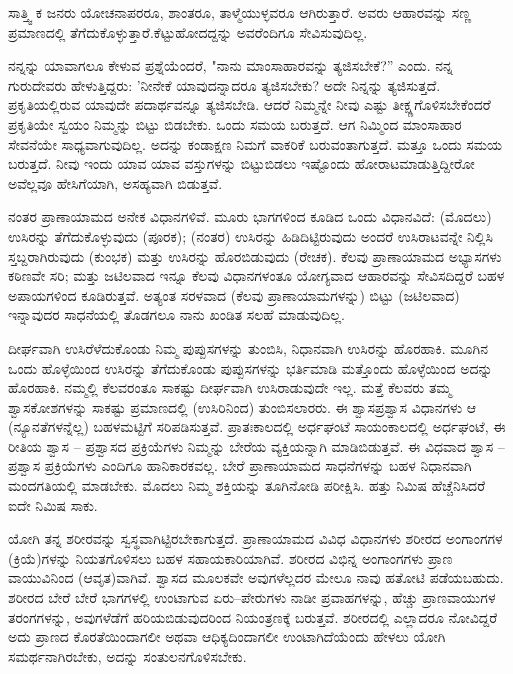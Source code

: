 ಸಾತ್ತ್ವಿ ಕ ಜನರು ಯೋಚನಾಪರರೂ, ಶಾಂತರೂ, ತಾಳ್ಮೆಯುಳ್ಳವರೂ ಆಗಿರುತ್ತಾರೆ. ಅವರು ಆಹಾರವನ್ನು ಸಣ್ಣ ಪ್ರಮಾಣದಲ್ಲಿ ತೆಗೆದುಕೊಳ್ಳುತ್ತಾರೆ.\break ಕೆಟ್ಟುಹೋದದ್ದನ್ನು ಅವರೆಂದಿಗೂ ಸೇವಿಸುವುದಿಲ್ಲ.

ನನ್ನನ್ನು ಯಾವಾಗಲೂ ಕೇಳುವ ಪ್ರಶ್ನೆಯೆಂದರೆ, "ನಾನು ಮಾಂಸಾಹಾರವನ್ನು ತ್ಯಜಿಸಬೇಕೆ?'' ಎಂದು. ನನ್ನ ಗುರುದೇವರು ಹೇಳುತ್ತಿದ್ದರು: 'ನೀನೇಕೆ ಯಾವುದನ್ನಾದರೂ ತ್ಯಜಿಸಬೇಕು? ಅದೇ ನಿನ್ನನ್ನು ತ್ಯಜಿಸುತ್ತದೆ. ಪ್ರಕೃತಿಯಲ್ಲಿರುವ ಯಾವುದೇ ಪದಾರ್ಥವನ್ನೂ ತ್ಯಜಿಸಬೇಡಿ. ಆದರೆ ನಿಮ್ಮನ್ನೇ ನೀವು ಎಷ್ಟು ತೀಕ್ಷ್ಣಗೊಳಿಸಬೇಕೆಂದರೆ ಪ್ರಕೃತಿಯೇ ಸ್ವಯಂ ನಿಮ್ಮನ್ನು ಬಿಟ್ಟು ಬಿಡಬೇಕು. ಒಂದು ಸಮಯ ಬರುತ್ತದೆ. ಆಗ ನಿಮ್ಮಿಂದ ಮಾಂಸಾಹಾರ ಸೇವನೆಯೇ ಸಾಧ್ಯವಾಗುವುದಿಲ್ಲ. ಅದನ್ನು ಕಂಡಾಕ್ಷಣ ನಿಮಗೆ ವಾಕರಿಕೆ ಬರುವಂತಾಗುತ್ತದೆ. ಮತ್ತೂ ಒಂದು ಸಮಯ ಬರುತ್ತದೆ. ನೀವು ಇಂದು ಯಾವ ಯಾವ ವಸ್ತುಗಳನ್ನು ಬಿಟ್ಟುಬಿಡಲು ಇಷ್ಟೊಂದು ಹೋರಾಟ\break ಮಾಡುತ್ತಿದ್ದೀರೋ ಅವೆಲ್ಲವೂ ಹೇಸಿಗೆಯಾಗಿ, ಅಸಹ್ಯವಾಗಿ ಬಿಡುತ್ತವೆ.

ನಂತರ ಪ್ರಾಣಾಯಾಮದ ಅನೇಕ ವಿಧಾನಗಳಿವೆ. ಮೂರು ಭಾಗಗಳಿಂದ ಕೂಡಿದ ಒಂದು ವಿಧಾನವಿದೆ: (ಮೊದಲು) ಉಸಿರನ್ನು ತೆಗೆದುಕೊಳ್ಳುವುದು (ಪೂರಕ); (ನಂತರ) ಉಸಿರನ್ನು ಹಿಡಿದಿಟ್ಟಿರುವುದು ಅಂದರೆ ಉಸಿರಾಟವನ್ನೇ ನಿಲ್ಲಿಸಿ ಸ್ತಬ್ದರಾಗಿರುವುದು (ಕುಂಭಕ) ಮತ್ತು ಉಸಿರನ್ನು ಹೊರಬಿಡುವುದು (ರೇಚಕ). ಕೆಲವು ಪ್ರಾಣಾಯಾಮದ ಅಭ್ಯಾಸಗಳು ಕಠಿಣವೇ ಸರಿ; ಮತ್ತು ಜಟಿಲವಾದ ಇನ್ನೂ ಕೆಲವು ವಿಧಾನಗಳಂತೂ ಯೋಗ್ಯವಾದ ಆಹಾರವನ್ನು ಸೇವಿಸದಿದ್ದರೆ ಬಹಳ ಅಪಾಯಗಳಿಂದ ಕೂಡಿರುತ್ತವೆ. ಅತ್ಯಂತ ಸರಳವಾದ (ಕೆಲವು ಪ್ರಾಣಾಯಾಮಗಳನ್ನು) ಬಿಟ್ಟು (ಜಟಿಲವಾದ) ಇನ್ನಾವುದರ ಸಾಧನೆಯಲ್ಲಿ ತೊಡಗಲೂ ನಾನು ಖಂಡಿತ ಸಲಹೆ ಮಾಡುವುದಿಲ್ಲ.

ದೀರ್ಘವಾಗಿ ಉಸಿರೆಳೆದುಕೊಂಡು ನಿಮ್ಮ ಪುಪ್ಪುಸಗಳನ್ನು ತುಂಬಿಸಿ, ನಿಧಾನವಾಗಿ ಉಸಿರನ್ನು ಹೊರಹಾಕಿ. ಮೂಗಿನ ಒಂದು ಹೊಳ್ಳೆಯಿಂದ ಉಸಿರನ್ನು ತೆಗೆದುಕೊಂಡು ಪುಪ್ಪುಸಗಳನ್ನು ಭರ್ತಿಮಾಡಿ ಮತ್ತೊಂದು ಹೊಳ್ಳೆಯಿಂದ ಅದನ್ನು ಹೊರಹಾಕಿ. ನಮ್ಮಲ್ಲಿ ಕೆಲವರಂತೂ ಸಾಕಷ್ಟು ದೀರ್ಘವಾಗಿ ಉಸಿರಾಡುವುದೇ ಇಲ್ಲ. ಮತ್ತೆ ಕೆಲವರು ತಮ್ಮ ಶ್ವಾಸಕೋಶಗಳನ್ನು ಸಾಕಷ್ಟು ಪ್ರಮಾಣದಲ್ಲಿ (ಉಸಿರಿನಿಂದ) ತುಂಬಿಸಲಾರರು. ಈ ಶ್ವಾಸಪ್ರಶ್ವಾಸ ವಿಧಾನಗಳು ಆ (ನ್ಯೂನತೆಗಳನ್ನೆಲ್ಲ) ಬಹಳಮಟ್ಟಿಗೆ ಸರಿಪಡಿಸುತ್ತವೆ. ಪ್ರಾತಃಕಾಲದಲ್ಲಿ ಅರ್ಧಘಂಟೆ ಸಾಯಂಕಾಲದಲ್ಲಿ ಅರ್ಧಘಂಟೆ, ಈ ರೀತಿಯ ಶ್ವಾಸ – ಪ್ರಶ್ವಾಸದ ಪ್ರಕ್ರಿಯೆಗಳು ನಿಮ್ಮನ್ನು ಬೇರೆಯ ವ್ಯಕ್ತಿಯನ್ನಾಗಿ ಮಾಡಿಬಿಡುತ್ತವೆ. ಈ ವಿಧವಾದ ಶ್ವಾಸ – ಪ್ರಶ್ವಾಸ ಪ್ರಕ್ರಿಯೆಗಳು ಎಂದಿಗೂ ಹಾನಿಕಾರಕವಲ್ಲ. ಬೇರೆ ಪ್ರಾಣಾಯಾಮದ ಸಾಧನೆಗಳನ್ನು ಬಹಳ ನಿಧಾನವಾಗಿ ಮಂದಗತಿಯಲ್ಲಿ ಮಾಡಬೇಕು. ಮೊದಲು ನಿಮ್ಮ ಶಕ್ತಿಯನ್ನು ತೂಗಿನೋಡಿ ಪರೀಕ್ಷಿಸಿ. ಹತ್ತು ನಿಮಿಷ ಹೆಚ್ಚೆನಿಸಿದರೆ ಐದೇ ನಿಮಿಷ ಸಾಕು.

ಯೋಗಿ ತನ್ನ ಶರೀರವನ್ನು ಸ್ವಸ್ಥವಾಗಿಟ್ಟಿರಬೇಕಾಗುತ್ತದೆ. ಪ್ರಾಣಾಯಾಮದ ವಿವಿಧ ವಿಧಾನಗಳು ಶರೀರದ ಅಂಗಾಂಗಗಳ (ಕ್ರಿಯೆ)ಗಳನ್ನು ನಿಯತಗೊಳಿಸಲು ಬಹಳ ಸಹಾಯಕಾರಿಯಾಗಿವೆ. ಶರೀರದ ವಿಭಿನ್ನ ಅಂಗಾಂಗಗಳು ಪ್ರಾಣ ವಾಯುವಿನಿಂದ (ಆವೃತ)ವಾಗಿವೆ. ಶ್ವಾಸದ ಮೂಲಕವೇ ಅವುಗಳೆಲ್ಲದರ ಮೇಲೂ ನಾವು ಹತೋಟಿ ಪಡೆಯಬಹುದು. ಶರೀರದ ಬೇರೆ ಬೇರೆ ಭಾಗಗಳಲ್ಲಿ ಉಂಟಾಗುವ ಏರು–ಪೇರುಗಳು ನಾಡೀ ಪ್ರವಾಹಗಳನ್ನು, ಹೆಚ್ಚು ಪ್ರಾಣವಾಯುಗಳ ತರಂಗಗಳನ್ನು, ಅವುಗಳೆಡೆಗೆ ಹರಿಯಬಿಡುವುದರಿಂದ ನಿಯಂತ್ರಣಕ್ಕೆ ಬರುತ್ತವೆ. ಶರೀರದಲ್ಲಿ ಎಲ್ಲಾದರೂ ನೋವಿದ್ದರೆ ಅದು ಪ್ರಾಣದ ಕೊರತೆಯಿಂದಾಗಲೀ ಅಥವಾ ಆಧಿಕ್ಯದಿಂದಾಗಲೀ ಉಂಟಾಗಿದೆಯೆಂದು ಹೇಳಲು ಯೋಗಿ ಸಮರ್ಥನಾಗಿರಬೇಕು, ಅದನ್ನು ಸಂತುಲನಗೊಳಿಸಬೇಕು.

